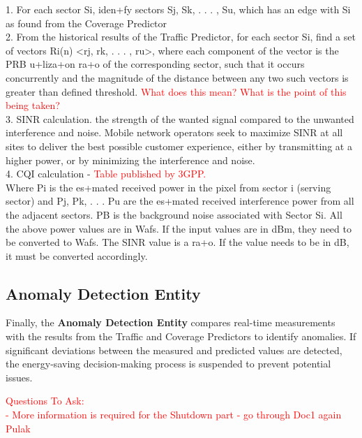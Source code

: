 \documentclass[conference]{IEEEtran}
\begin{document}
1. For each sector Si, iden+fy sectors Sj, Sk, . . . , Su, which has an edge with Si as found from the Coverage Predictor \\
2. From the historical results of the Traffic Predictor, for each sector Si, find a set of vectors Ri(n) <rj, rk, . . . , ru>, where each component of the vector is the PRB u+liza+on ra+o of the corresponding sector, such that it occurs concurrently and the magnitude of the distance between any two such vectors is greater than defined threshold. \textcolor{red}{What does this mean? What is the point of this being taken?} \\

3. SINR calculation. the strength of the wanted signal compared to the unwanted interference and noise. Mobile network operators seek to maximize SINR at all sites to deliver the best possible customer experience, either by transmitting at a higher power, or by minimizing the interference and noise. \\

4. CQI calculation - \textcolor{red}{Table published by 3GPP.} \\

Where Pi is the es+mated received power in the pixel from sector i (serving sector) and Pj, Pk, . . . Pu are the es+mated received interference power from all the adjacent sectors. PB is the background noise associated with Sector Si. All the above power values are in Wafs. If the input values are in dBm, they need to be converted to Wafs. The SINR value is a ra+o. If the value needs to be in dB, it must be converted accordingly.

\subsection{Anomaly Detection Entity}

Finally, the \textbf{Anomaly Detection Entity} compares real-time measurements with the results from the Traffic and Coverage Predictors to identify anomalies. If significant deviations between the measured and predicted values are detected, the energy-saving decision-making process is suspended to prevent potential issues.

\textcolor{red}{
Questions To Ask: \\
- More information is required for the Shutdown part - go through Doc1 again Pulak \\}
\end{document}
